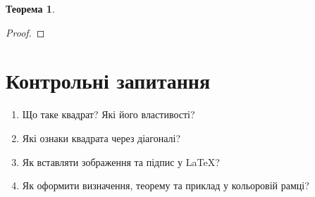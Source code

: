 \documentclass[12pt]{article} %
\newtheorem{theorem}{Теорема} %
\begin{document}
\begin{tcolorbox}[colback=blue!5!white, colframe=blue!75!black, title=Ознаки квадрата]
\begin{theorem}
\end{theorem}
\end{tcolorbox}

\begin{proof}
\end{proof}

\section*{Контрольні запитання}
\begin{enumerate}
    \item Що таке квадрат? Які його властивості?
    \item Які ознаки квадрата через діагоналі?
    \item Як вставляти зображення та підпис у LaTeX?
    \item Як оформити визначення, теорему та приклад у кольоровій рамці?
\end{enumerate}
\end{document}

